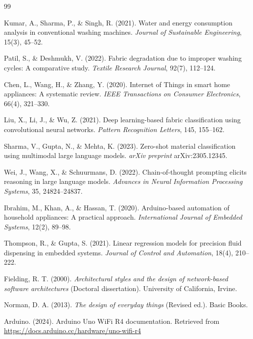 \clearpage
\renewcommand{\bibname}{References}
{}

\begin{thebibliography}{99}

Kumar, A., Sharma, P., \& Singh, R. (2021).
Water and energy consumption analysis in conventional washing machines.
\emph{Journal of Sustainable Engineering}, 15(3), 45–52.

Patil, S., \& Deshmukh, V. (2022).
Fabric degradation due to improper washing cycles: A comparative study.
\emph{Textile Research Journal}, 92(7), 112–124.

Chen, L., Wang, H., \& Zhang, Y. (2020).
Internet of Things in smart home appliances: A systematic review.
\emph{IEEE Transactions on Consumer Electronics}, 66(4), 321–330.

Liu, X., Li, J., \& Wu, Z. (2021).
Deep learning-based fabric classification using convolutional neural networks.
\emph{Pattern Recognition Letters}, 145, 155–162.

Sharma, V., Gupta, N., \& Mehta, K. (2023).
Zero-shot material classification using multimodal large language models.
\emph{arXiv preprint} arXiv:2305.12345.

Wei, J., Wang, X., \& Schuurmans, D. (2022).
Chain-of-thought prompting elicits reasoning in large language models.
\emph{Advances in Neural Information Processing Systems}, 35, 24824–24837.

Ibrahim, M., Khan, A., \& Hassan, T. (2020).
Arduino-based automation of household appliances: A practical approach.
\emph{International Journal of Embedded Systems}, 12(2), 89–98.

Thompson, R., \& Gupta, S. (2021).
Linear regression models for precision fluid dispensing in embedded systems.
\emph{Journal of Control and Automation}, 18(4), 210–222.

Fielding, R. T. (2000).
\emph{Architectural styles and the design of network-based software architectures}
(Doctoral dissertation). University of California, Irvine.

Norman, D. A. (2013).
\emph{The design of everyday things} (Revised ed.). Basic Books.

Arduino. (2024).
Arduino Uno WiFi R4 documentation.
Retrieved from \url{https://docs.arduino.cc/hardware/uno-wifi-r4}


\end{thebibliography}
